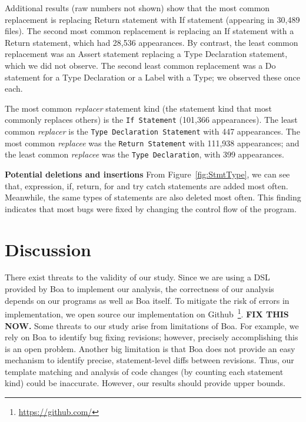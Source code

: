 \documentclass{sig-alternate-05-2015}
\newcommand{\todo}[1]
  {{\scriptsize \textbf{\color{red} {#1}}}}
\begin{document}
Additional results (raw numbers not shown) show that the most common replacement
is replacing Return statement with If statement (appearing in 30,489 files). The
second most common replacement is replacing an If statement with a Return
statement, which had 28,536 appearances. 
By contrast, the least common replacement was an Assert
statement replacing a Type Declaration statement, which we did not observe. 
The second least common replacement was a Do statement for a Type
Declaration or a Label with a Type; we observed these once each.  

The most common
\emph{replacer} statement kind (the statement kind that most commonly replaces
others) is the \texttt{If Statement} (101,366 appearances). The least
common \emph{replacer} is the \texttt{Type Declaration Statement} with 447
appearances.
The most common \emph{replacee} was the
\texttt{Return Statement} with 111,938 appearances; and the least common
\emph{replacee} was the \texttt{Type Declaration}, with 399 appearances.

\vspace{1ex}
\noindent \textbf{Potential deletions and insertions} From Figure~\ref{fig:StmtType}, we
can see that, expression, if, return, for and try catch statements are added
most often. Meanwhile, the same types of statements are also deleted most
often. This finding indicates that most bugs were fixed by changing the control
flow of the program.


\section{Discussion}

There exist threats to the validity of our study. Since we are using a DSL
provided by Boa to implement our analysis, the correctness of our analysis
depends on our programs as well as Boa itself. To mitigate the risk of errors in
implementation, we open source our implementation on
Github~\footnote{\url{https://github.com/}}.\todo{FIX THIS NOW.}  Some threats
to our study arise from limitations of Boa. For example, we rely on Boa to
identify bug fixing revisions; however, precisely accomplishing this is an open
problem. Another big limitation is that Boa does not provide an easy mechanism
to identify precise, statement-level diffs between revisions. Thus, our template
matching and analysis of code changes (by counting each statement kind) could be
inaccurate. However, our results should provide upper bounds.
\end{document}
